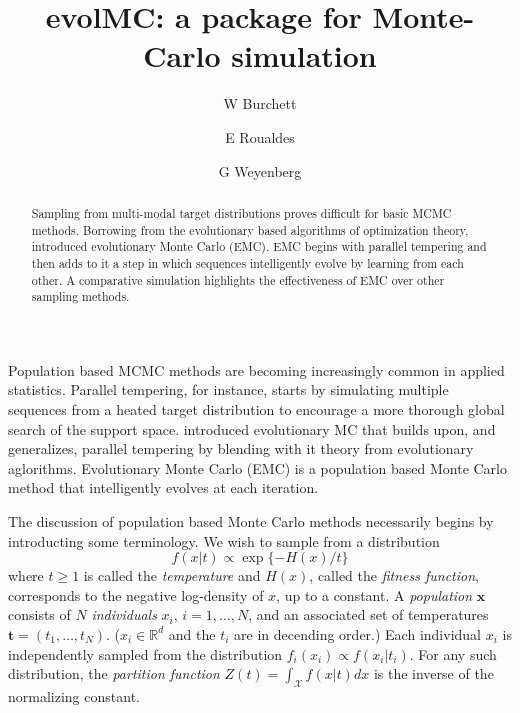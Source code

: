 \documentclass[12pt]{article}\usepackage[]{graphicx}\usepackage[]{color}
\title{evolMC: a package for Monte-Carlo simulation}
\author{W Burchett \and E Roualdes \and G Weyenberg}
\newcommand{\grady}[1]{\marginpar{#1--Grady}}
\newcommand{\bt}{\mathbf t}
\newcommand{\X}{\mathcal X}
\begin{document}
\maketitle


\begin{abstract}
  Sampling from multi-modal target distributions proves difficult for
  basic MCMC methods.  Borrowing from the evolutionary based
  algorithms of optimization theory, \cite{liang2000evolutionary}
  introduced evolutionary Monte Carlo (EMC).  EMC begins with parallel
  tempering and then adds to it a step in which sequences
  intelligently evolve by learning from each other.  A comparative
  simulation highlights the effectiveness of EMC over other sampling
  methods.
\end{abstract}

\vspace{1cm}
\label{sec:introduction}

Population based MCMC methods are becoming increasingly common in
applied statistics.  Parallel tempering, for instance, starts by
simulating multiple sequences from a heated target distribution to
encourage a more thorough global search of the support space.
\cite{liang2000evolutionary} introduced evolutionary MC that builds
upon, and generalizes, parallel tempering by blending with it theory
from evolutionary aglorithms. Evolutionary Monte Carlo (EMC) is a
population based Monte Carlo method that intelligently evolves at each
iteration.

The discussion of population based Monte Carlo methods necessarily
begins by introducting some terminology.  We wish to sample from a
distribution \[f(x|t) \propto \exp\{ -H(x)/t \}\] where $t\ge 1$ is
called the \emph{temperature} and $H(x)$, called the \emph{fitness
  function}, corresponds to the negative log-density of $x$, up to a
constant. A \emph{population} $\mathbf{x}$ consists of $N$
\emph{individuals} $x_i$, $i = 1, \ldots, N$, and an associated set of
temperatures $\bt = (t_1,\ldots,t_N)$. ($x_i \in \mathbb{R}^d$ and the
$t_i$ are in decending order.) Each
individual $x_i$ is independently sampled from the distribution
$f_i(x_i) \propto f(x_i|t_i)$.  For any such distribution, the
\emph{partition function} $Z(t)= \int_\X f(x|t) dx$ is the inverse of
the normalizing constant. \grady{Citation?  Basic fact?}
\end{document}
